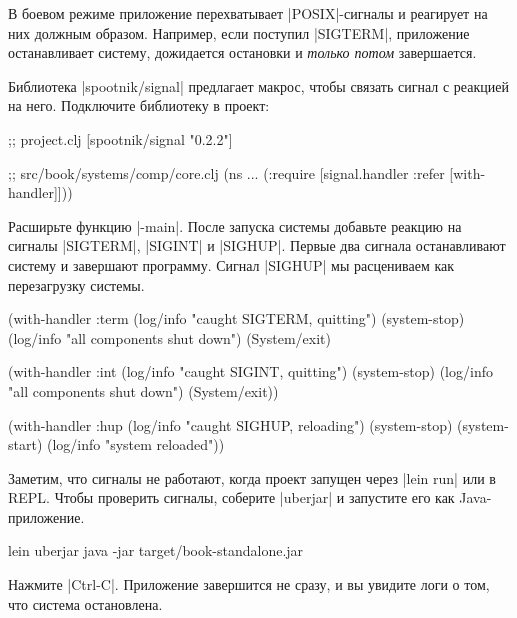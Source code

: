 В боевом режиме приложение перехватывает \spverb|POSIX|-сигналы и реагирует на
них должным образом. Например, если поступил \spverb|SIGTERM|, приложение
останавливает систему, дожидается остановки и \emph{только потом} завершается.

Библиотека \spverb|spootnik/signal|
предлагает макрос, чтобы связать сигнал с реакцией на него. Подключите
библиотеку в проект:

\begin{english}
  \begin{clojure}
;; project.clj
[spootnik/signal "0.2.2"]

;; src/book/systems/comp/core.clj
(ns ...
  (:require [signal.handler :refer [with-handler]]))
  \end{clojure}
\end{english}

Расширьте функцию \spverb|-main|. После запуска системы добавьте реакцию на
сигналы \spverb|SIGTERM|, \spverb|SIGINT| и \spverb|SIGHUP|. Первые два сигнала
останавливают систему и завершают программу. Сигнал \spverb|SIGHUP| мы
расцениваем как перезагрузку системы.

\begin{english}
  \begin{clojure}
(with-handler :term
  (log/info "caught SIGTERM, quitting")
  (system-stop)
  (log/info "all components shut down")
  (System/exit)

(with-handler :int
  (log/info "caught SIGINT, quitting")
  (system-stop)
  (log/info "all components shut down")
  (System/exit))

(with-handler :hup
  (log/info "caught SIGHUP, reloading")
  (system-stop)
  (system-start)
  (log/info "system reloaded"))
  \end{clojure}
\end{english}

Заметим, что сигналы не работают, когда проект запущен через \spverb|lein run|
или в REPL. Чтобы проверить сигналы, соберите \spverb|uberjar| и запустите его
как Java-приложение.

\begin{english}
  \begin{bash}
lein uberjar
java -jar target/book-standalone.jar
  \end{bash}
\end{english}

Нажмите \spverb|Ctrl-C|. Приложение завершится не сразу, и вы увидите логи о
том, что система остановлена.

